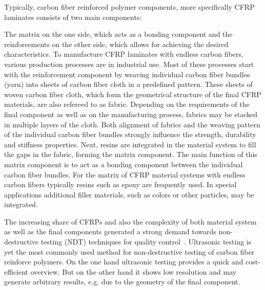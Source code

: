 Typically,  carbon fiber reinforced polymer components, more specifically CFRP laminates consists of two main components:

The matrix on the one side, which acts as a bonding component and the reinforcements on the other side, which allows for achieving the desired characteristics. To manufacture CFRP laminates with endless carbon fibers, various production processes are in industrial use. Most of these processes start with the reinforcement component by weaving individual carbon fiber bundles (yarn) into sheets of carbon fiber cloth in a predefined pattern. These sheets of woven carbon fiber cloth, which form the geometrical structure of the final CFRP materials, are also refereed to as fabric. Depending on the requirements of the final component as well as on the manufacturing process, fabrics may be stacked in multiple layers of the cloth. Both alignment of fabrics and the weaving pattern of the individual carbon fiber bundles strongly influence the strength, durability and stiffness properties. Next, resins are integrated in the material system to fill the gaps in the fabric, forming the matrix component. The main function of this matrix component is to act as a bonding component between the individual carbon fiber bundles. For the matrix of CFRP material systems with endless carbon fibers typically resins such as epoxy are frequently used. In special applications additional filler materials, such as colors or other particles, may be integrated. 

The increasing share of CFRPs and also the complexity of both material system as well as the final components generated a strong demand towards non-destructive testing (NDT) techniques for quality control~\cite{Red2012}. Ultrasonic testing is yet the most commonly used method for non-destructive testing of carbon fiber reinforce polymers. On the one hand ultrasonic testing provides a quick and cost-efficient overview. But on the other hand it shows low resolution and may generate arbitrary results, e.g. due to the geometry of the final component. 


